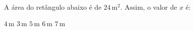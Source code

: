 A \'area do ret\^angulo abaixo \'e de $24$\,m$^2$. Assim, o valor de $x$ \'e:

\parbox{0.35\linewidth}{

$4$\,m
$3$\,m
$5$\,m
$6$\,m
$7$\,m

}\parbox{0.64\linewidth}{
\begin{center}
\vspace{-6mm}
\vspace{-9mm}
\end{center}
}


